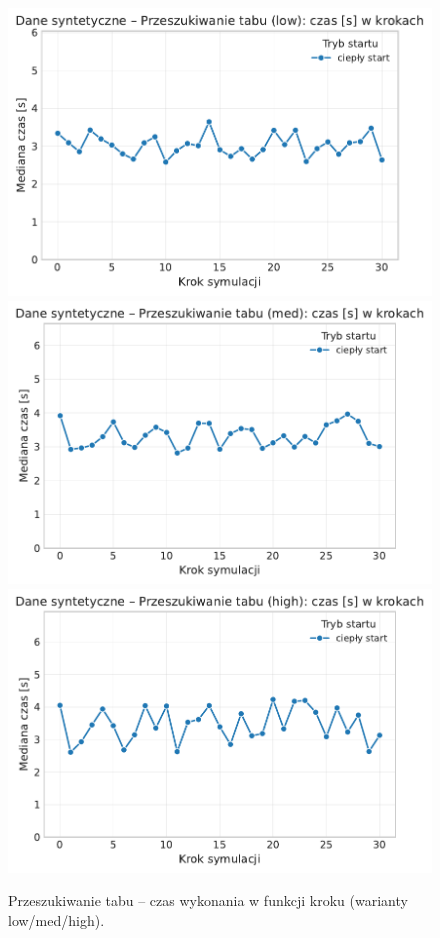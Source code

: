 \begin{figure}[H]
  \centering
  \includegraphics[width=0.62\linewidth]{assets/figures/dynamic/synthetic/synthetic_przeszukiwanie_tabu_time_over_steps_low.pdf}\\[0.4em]
  \includegraphics[width=0.62\linewidth]{assets/figures/dynamic/synthetic/synthetic_przeszukiwanie_tabu_time_over_steps_med.pdf}\\[0.4em]
  \includegraphics[width=0.62\linewidth]{assets/figures/dynamic/synthetic/synthetic_przeszukiwanie_tabu_time_over_steps_high.pdf}
  \caption{Przeszukiwanie tabu -- czas wykonania w funkcji kroku (warianty low/med/high).}
  \label{fig:dyn-synth-tabu-time}
\end{figure}

